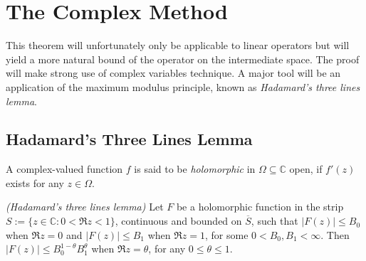 \section{The Complex Method}
This theorem will unfortunately only be applicable to linear operators but will yield a more natural bound of the operator on the intermediate space. The proof will make strong use of complex variables technique. A major tool will be an application of the maximum modulus principle, known as \emph{Hadamard's three lines lemma}.

\subsection{Hadamard's Three Lines Lemma}
A complex-valued function $f$ is said to be \emph{holomorphic}  in $\Omega \subseteq \mathbb{C}$ open, if $f'(z)$ exists for any $z \in \Omega$.

\vspace{2mm}

\begin{mdframed}
	\begin{lemma}\emph{(Hadamard's three lines lemma)}
		Let $F$ be a holomorphic function in the strip $S := \{z \in \mathbb{C}: 0 < \Re z < 1\}$, continuous and bounded on $\overline{S}$, such that $\left| F(z)\right| \leqslant B_0$ when $\Re z = 0$ and $\left| F(z) \right| \leqslant B_1$ when $\Re z = 1$, for some $0 < B_0,B_1 < \infty$. Then $\left| F(z) \right| \leqslant B_0^{1 - \theta}B_1^\theta$ when $\Re z = \theta$, for any $0 \leqslant \theta \leqslant 1$.
	\end{lemma}
\end{mdframed}

